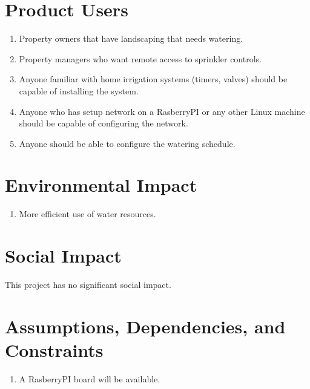 \documentclass[12pt,letterpaper]{article}
\begin{document}

\pagebreak

\section{Product Users}

\begin{enumerate}
\item Property owners that have landscaping that needs watering.
\item Property managers who want remote access to sprinkler controls.
\item Anyone familiar with home irrigation systems (timers, valves)
should be capable of installing the system.
\item Anyone who has setup network on a RasberryPI or any other Linux
machine should be capable of configuring the network.
\item Anyone should be able to configure the watering schedule.
\end{enumerate}


\section{Environmental Impact}

\begin{enumerate}
\item More efficient use of water resources.
\end{enumerate}

\section{Social Impact}

This project has no significant social impact.


\section{Assumptions, Dependencies, and Constraints}

\begin{enumerate}
\item A RasberryPI board will be available.
\end{enumerate}
\end{document}
